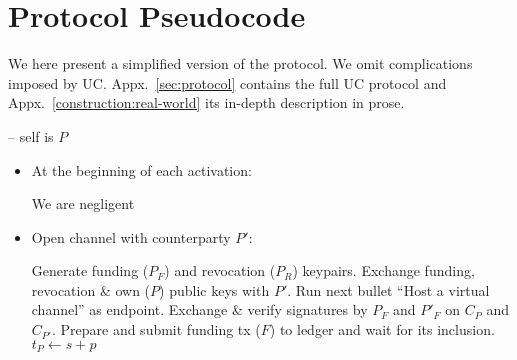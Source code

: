 \section{Protocol Pseudocode}
\label{sec:pseudocode}

We here present a simplified version of the \pchan protocol. We omit
complications imposed by UC. Appx.~\ref{sec:protocol} contains
the full UC protocol and Appx.~\ref{construction:real-world} its in-depth
description in prose.
\ \\

\begin{center}
  \begin{processbox}{\pchan -- self is $P$}
    \begin{itemize}
      \item At the beginning of each activation:
      \begin{algorithmic}[0]
          \State We are negligent 
        \EndIf
      \end{algorithmic}

      \item Open channel with counterparty $P'$: 
      \begin{algorithmic}[0]
        \State Generate funding ($P_F$) and revocation ($P_R$) keypairs.
        \State Exchange funding, revocation \& own ($P$) public keys with $P'$.
          \State Run next bullet ``Host a virtual channel'' as endpoint.
        \EndIf
        \State Exchange \& verify signatures by $P_F$ and $P'_F$ on
        $C_P$ and $C_{P'}$.
          \State Prepare and submit funding tx ($F$) to ledger and wait for
          its inclusion. 
          \State $t_P \gets s + p$ 
          \State {}
        \EndIf
      \end{algorithmic}


\end{itemize}
\end{processbox}
\end{center}
